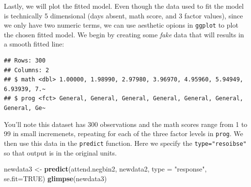 \documentclass[
]{book}
\newenvironment{Shaded}{\begin{snugshade}}{\end{snugshade}}
\newcommand{\AttributeTok}[1]{\textcolor[rgb]{0.13,0.29,0.53}{#1}}
\newcommand{\ConstantTok}[1]{\textcolor[rgb]{0.56,0.35,0.01}{#1}}
\newcommand{\DecValTok}[1]{\textcolor[rgb]{0.00,0.00,0.81}{#1}}
\newcommand{\FunctionTok}[1]{\textcolor[rgb]{0.13,0.29,0.53}{\textbf{#1}}}
\newcommand{\NormalTok}[1]{#1}
\newcommand{\OtherTok}[1]{\textcolor[rgb]{0.56,0.35,0.01}{#1}}
\newcommand{\SpecialCharTok}[1]{\textcolor[rgb]{0.81,0.36,0.00}{\textbf{#1}}}
\newcommand{\StringTok}[1]{\textcolor[rgb]{0.31,0.60,0.02}{#1}}
\begin{document}
Lastly, we will plot the fitted model. Even though the data used to fit the model is technically 5 dimensional (days absent, math score, and 3 factor values), since we only have two numeric terms, we can use aesthetic opions in \texttt{ggplot} to plot the chosen fitted model. We begin by creating some \emph{fake} data that will results in a smooth fitted line:

\begin{Shaded}
\end{Shaded}

\begin{verbatim}
## Rows: 300
## Columns: 2
## $ math <dbl> 1.00000, 1.98990, 2.97980, 3.96970, 4.95960, 5.94949, 6.93939, 7.~
## $ prog <fct> General, General, General, General, General, General, General, Ge~
\end{verbatim}

You'll note this dataset has 300 observations and the math scores range from 1 to 99 in small incremenets, repeating for each of the three factor levels in \texttt{prog}. We then use this data in the \texttt{predict} function. Here we specify the \texttt{type="resoibse"} so that output is in the original units.

\begin{Shaded}
\begin{Highlighting}[]
\NormalTok{newdata3 }\OtherTok{\textless{}{-}} \FunctionTok{predict}\NormalTok{(attend.negbin2, newdata2, }\AttributeTok{type =} \StringTok{"response"}\NormalTok{, }\AttributeTok{se.fit=}\ConstantTok{TRUE}\NormalTok{)}
\FunctionTok{glimpse}\NormalTok{(newdata3)}
\end{Highlighting}
\end{Shaded}
\end{document}
